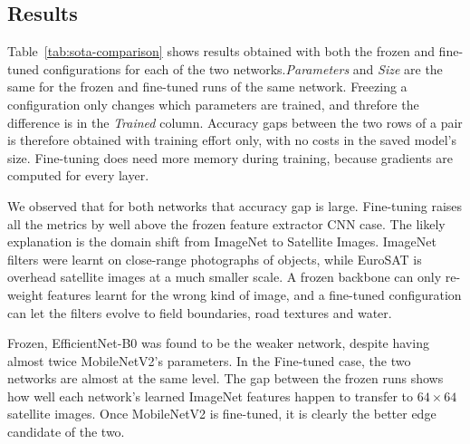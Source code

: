 \subsection{Results}
\label{sec:sota-results}

\begin{table}[htbp]
  \centering
  \footnotesize
  \setlength{\tabcolsep}{4pt}
  \caption{Pretrained lightweight models on the EuroSAT test split. Precision
  and recall are averages over the ten classes. \emph{Trained} counts the
  parameters updated during training. Sizes are in MB, measured from the saved
  weights; the custom models in Table~\ref{tab:custom-comparison} are in KB.
  The rows under Supplementary section upsamples the $64\times64$ images to $224\times224$.}
  \label{tab:sota-comparison}
\end{table}

Table~\ref{tab:sota-comparison} shows results obtained with both the frozen and fine-tuned configurations for each of the two networks.\emph{Parameters} and \emph{Size} are
the same for the frozen and fine-tuned runs of the same network. Freezing a configuration
only changes which parameters are trained, and threfore the difference is in the \emph{Trained} column. Accuracy
gaps between the two rows of a pair is therefore obtained with training effort
only, with no costs in the saved model's size. Fine-tuning does need more memory
during training, because gradients are computed for every layer.

We observed that for both networks that accuracy gap is large. Fine-tuning raises all the metrics by well
above the frozen feature extractor CNN case. The likely explanation is the domain shift from ImageNet to Satellite Images.
ImageNet filters were learnt on close-range photographs of objects, while
EuroSAT is overhead satellite images at a much smaller scale. 
A frozen backbone can only re-weight features learnt for the wrong kind of image, and a fine-tuned configuration can let the filters evolve to field boundaries, road textures and water.

Frozen, EfficientNet-B0 was found to be the weaker network, despite having almost twice
MobileNetV2's parameters. In the Fine-tuned case, the two networks are almost at the same level. The
gap between the frozen runs shows how well each network's learned ImageNet features happen to
transfer to $64\times64$ satellite images.
Once MobileNetV2 is fine-tuned, it is clearly the better edge candidate of the two.

